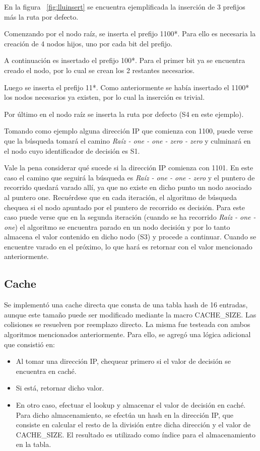 En la figura ~\ref{fig:lluinsert} se encuentra ejemplificada la inserción de 3 prefijos más la ruta por defecto. 

Comenzando por el nodo raíz, se inserta el prefijo 1100*. Para ello es necesaria la creación de 4 nodos hijos, uno por cada bit del prefijo. 

A continuación es insertado el prefijo 100*. Para el primer bit ya se encuentra creado el nodo, por lo cual se crean los 2 restantes necesarios.

Luego se inserta el prefijo 11*. Como anteriormente se había insertado el 1100* los nodos necesarios ya existen, por lo cual la inserción es trivial.

Por último en el nodo raíz se inserta la ruta por defecto (S4 en este ejemplo).

Tomando como ejemplo alguna dirección IP que comienza con 1100, puede verse que la búsqueda tomará el camino \textit{Raíz - one - one - zero - zero} y culminará en el nodo cuyo identificador de decisión es S1. 

Vale la pena considerar qué sucede si la dirección IP comienza con 1101. En este caso el camino que seguirá la búsqueda es \textit{Raíz - one - one - zero} y el puntero de recorrido quedará varado allí, ya que no existe en dicho punto un nodo asociado al puntero one. Recuérdese que en cada iteración, el algoritmo de búsqueda chequea si el nodo apuntado por el puntero de recorrido es decisión. Para este caso puede verse que en la segunda iteración (cuando se ha recorrido \textit{Raíz - one - one}) el algoritmo se encuentra parado en un nodo decisión y por lo tanto almacena el valor contenido en dicho nodo (S3) y procede a continuar. Cuando se encuentre varado en el próximo, lo que hará es retornar con el valor mencionado anteriormente. 

\subsection {Cache}

Se implementó una cache directa que consta de una tabla hash de 16 entradas, aunque este tamaño puede ser modificado mediante la macro CACHE\_SIZE. Las colisiones se resuelven por reemplazo directo. La misma fue testeada con ambos algoritmos mencionados anteriormente. Para ello, se agregó una lógica adicional que consistió en:

\begin{itemize}
	\item Al tomar una dirección IP, chequear primero si el valor de decisión se encuentra en caché.
	\item Si está, retornar dicho valor.
	\item En otro caso, efectuar el lookup y almacenar el valor de decisión en caché. Para dicho almacenamiento, se efectúa un hash en la dirección IP, que consiste en calcular el resto de la división entre dicha dirección y el valor de CACHE\_SIZE. El resultado es utilizado como índice para el almacenamiento en la tabla.
\end{itemize}

